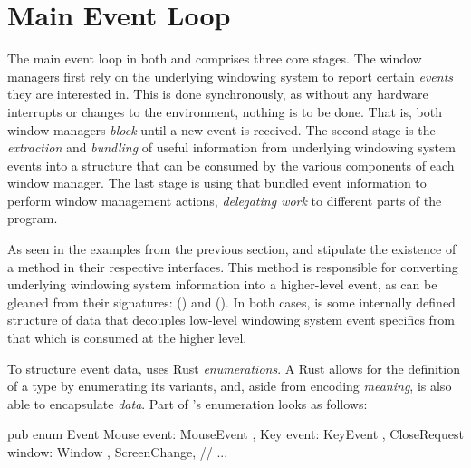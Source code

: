 \section{Main Event Loop}\label{maineventloop}

The main event loop in both \wmrs and \wmcpp comprises three core stages. The
window managers first rely on the underlying windowing system to report certain
\textit{events} they are interested in. This is done synchronously, as without
any hardware interrupts or changes to the environment, nothing is to be done.
That is, both window managers \textit{block} until a new event is received.
The second stage is the \textit{extraction} and \textit{bundling} of useful
information from underlying windowing system events into a structure that can
be consumed by the various components of each window manager. The last stage
is using that bundled event information to perform window management actions,
\textit{delegating work} to different parts of the program.


As seen in the examples from the previous section, \wmrs and \wmcpp stipulate
the existence of a  method in their respective 
interfaces. This method is responsible for converting underlying windowing
system information into a higher-level event, as can be gleaned from their
signatures:  (\wmrs) and  (\wmcpp). In both cases,  is some internally defined
structure of data that decouples low-level windowing system event specifics from
that which is consumed at the higher level.



To structure event data, \wmrs uses Rust \textit{enumerations}. A Rust
 allows for the definition of a type by enumerating its variants,
and, aside from encoding \textit{meaning}, is also able to encapsulate
\textit{data}\cite{therustbook}. Part of \wmrs's  enumeration looks
as follows:

\begin{rustblock}
  pub enum Event {
    Mouse { event: MouseEvent },
    Key { event: KeyEvent },
    CloseRequest { window: Window },
    ScreenChange,
    // ...
  }
\end{rustblock}

